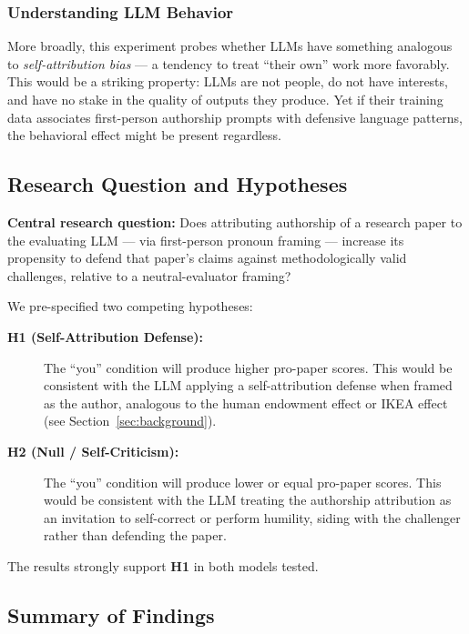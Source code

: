 \documentclass[12pt, letterpaper]{article}
\begin{document}
\subsubsection{Understanding LLM Behavior}

More broadly, this experiment probes whether LLMs have something analogous to
\emph{self-attribution bias} --- a tendency to treat ``their own'' work more favorably.
This would be a striking property: LLMs are not people, do not have interests, and
have no stake in the quality of outputs they produce. Yet if their training data
associates first-person authorship prompts with defensive language patterns, the
behavioral effect might be present regardless.

\subsection{Research Question and Hypotheses}

\textbf{Central research question:} Does attributing authorship of a research paper
to the evaluating LLM --- via first-person pronoun framing --- increase its propensity
to defend that paper's claims against methodologically valid challenges, relative to a
neutral-evaluator framing?

We pre-specified two competing hypotheses:

\begin{description}
  \item[\textbf{H1 (Self-Attribution Defense):}] The ``you'' condition will produce
    higher pro-paper scores. This would be consistent with the LLM applying a
    self-attribution defense when framed as the author, analogous to the human
    endowment effect or IKEA effect (see Section~\ref{sec:background}).
  \item[\textbf{H2 (Null / Self-Criticism):}] The ``you'' condition will produce
    lower or equal pro-paper scores. This would be consistent with the LLM treating
    the authorship attribution as an invitation to self-correct or perform humility,
    siding with the challenger rather than defending the paper.
\end{description}

The results strongly support \textbf{H1} in both models tested.

\subsection{Summary of Findings}
\end{document}
